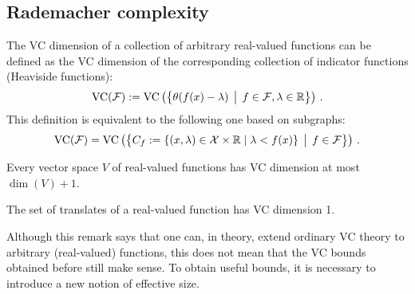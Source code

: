 
\subsection{Rademacher complexity}

    \begin{remark}
        The VC dimension of a collection of arbitrary real-valued functions can be defined as the VC dimension of the corresponding collection of indicator functions (Heaviside functions):
        \begin{gather}
            \mathrm{VC}(\mathcal{F}) := \mathrm{VC}\left(\bigl\{\theta(f(x)-\lambda)\,\bigm\vert\,f\in\mathcal{F},\lambda\in\mathbb{R}\bigr\}\right)\,.
        \end{gather}
        This definition is equivalent to the following one based on subgraphs:
        \begin{gather}
            \mathrm{VC}(\mathcal{F}) = \mathrm{VC}\left(\bigl\{C_f:=\{(x,\lambda)\in\mathcal{X}\times\mathbb{R}\mid\lambda<f(x)\}\,\bigm\vert\,f\in\mathcal{F}\bigr\}\right)\,.
        \end{gather}
    \end{remark}

    \begin{example}
        Every vector space $V$ of real-valued functions has VC dimension at most $\dim(V)+1$.
    \end{example}
    \begin{example}[Translations]
        The set of translates of a real-valued function has VC dimension 1.
    \end{example}

    Although this remark says that one can, in theory, extend ordinary VC theory to arbitrary (real-valued) functions, this does not mean that the VC bounds obtained before still make sense. To obtain useful bounds, it is necessary to introduce a new notion of effective size.


